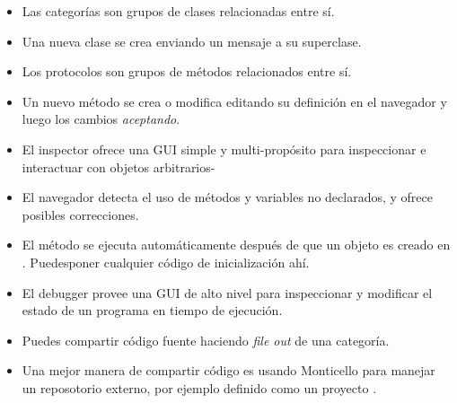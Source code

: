\documentclass[a4paper,10pt,twoside]{book}
\begin{document}
\begin{itemize}
  \item Las categor\'ias son grupos de clases relacionadas entre s\'i.
  \item Una nueva clase se crea enviando un mensaje a su superclase.
  \item Los protocolos son grupos de m\'etodos relacionados entre s\'i.
  \item Un nuevo m\'etodo se crea o modifica editando su definici\'on en el navegador y luego los cambios \emph{aceptando}.
  \item El inspector ofrece una GUI simple y multi-prop\'osito para inspeccionar e interactuar con objetos arbitrarios-
  \item El navegador detecta el uso de m\'etodos y variables no declarados, y ofrece posibles correcciones.
  \item El m\'etodo  se ejecuta autom\'aticamente despu\'es de que un objeto es creado en \pharo. Puedesponer cualquier c\'odigo de inicializaci\'on ah\'i.
  \item El debugger provee una GUI de alto nivel para inspeccionar y modificar el estado de un programa en tiempo de ejecuci\'on.
  \item Puedes compartir c\'odigo fuente haciendo \emph{file out} de una categor\'ia.
  \item Una mejor manera de compartir c\'odigo es usando Monticello para manejar un reposotorio externo, por ejemplo definido como un proyecto \sqsrc.
\end{itemize}

\ifx\wholebook\relax\else
\end{document}
